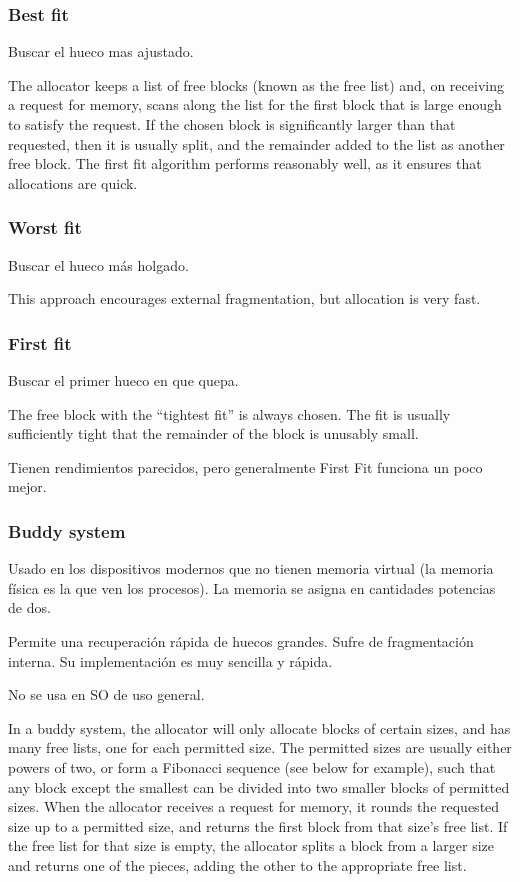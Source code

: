 \documentclass[a4paper, twoside]{article}
\begin{document}
\subsubsection{Best fit}
Buscar el hueco mas ajustado.

The allocator keeps a list of free blocks (known as the free list) and, on receiving a request for memory, scans along the list for the first block that is large enough to satisfy the request. If the chosen block is significantly larger than that requested, then it is usually split, and the remainder added to the list as another free block. The first fit algorithm performs reasonably well, as it ensures that allocations are quick.

\subsubsection{Worst fit}
Buscar el hueco más holgado.

This approach encourages external fragmentation, but allocation is very fast.

\subsubsection{First fit}
Buscar el primer hueco en que quepa.

The free block with the “tightest fit” is always chosen. The fit is usually sufficiently tight that the remainder of the block is unusably small.

Tienen rendimientos parecidos, pero generalmente First Fit funciona un poco mejor.

\subsubsection{Buddy system} 
Usado en los dispositivos modernos que no tienen memoria virtual (la memoria física es la que ven los procesos). 
La memoria se asigna en cantidades potencias de dos.

Permite una recuperación rápida de huecos grandes. Sufre de fragmentación interna. Su implementación es muy sencilla y rápida.

No se usa en SO de uso general.

In a buddy system, the allocator will only allocate blocks of certain sizes, and has many free lists, one for each permitted size. The permitted sizes are usually either powers of two, or form a Fibonacci sequence (see below for example), such that any block except the smallest can be divided into two smaller blocks of permitted sizes.
When the allocator receives a request for memory, it rounds the requested size up to a permitted size, and returns the first block from that size’s free list. If the free list for that size is empty, the allocator splits a block from a larger size and returns one of the pieces, adding the other to the appropriate free list.
\end{document}
